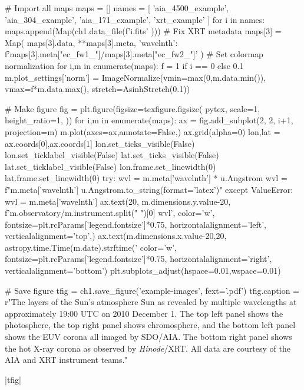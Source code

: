 \begin{pycode}[chapter1]
# Import all maps
maps = []
names = [ 'aia_4500_example', 'aia_304_example', 'aia_171_example', 'xrt_example' ]
for i in names:
    maps.append(Map(ch1.data_file(f'{i}.fits' )))
# Fix XRT metadata
maps[3] = Map(
    maps[3].data,
    {**maps[3].meta, 'wavelnth': f'{maps[3].meta["ec_fw1_"]}/{maps[3].meta["ec_fw2_"]}'}
)
# Set colormap normalization
for i,m in enumerate(maps):
    f = 1 if i == 0 else 0.1
    m.plot_settings['norm'] = ImageNormalize(vmin=max(0,m.data.min()),
                                             vmax=f*m.data.max(),
                                             stretch=AsinhStretch(0.1))

# Make figure
fig = plt.figure(figsize=texfigure.figsize(
    pytex,
    scale=1,
    height_ratio=1,
))
for i,m in enumerate(maps):
    ax = fig.add_subplot(2, 2, i+1, projection=m)
    m.plot(axes=ax,annotate=False,)
    ax.grid(alpha=0)
    lon,lat = ax.coords[0],ax.coords[1]
    lon.set_ticks_visible(False)
    lon.set_ticklabel_visible(False)
    lat.set_ticks_visible(False)
    lat.set_ticklabel_visible(False)
    lon.frame.set_linewidth(0)
    lat.frame.set_linewidth(0)
    try:
        wvl = m.meta['wavelnth'] * u.Angstrom
        wvl = f"{m.meta['wavelnth']} {u.Angstrom.to_string(format='latex')}"
    except ValueError:
        wvl = m.meta['wavelnth']
    ax.text(20, m.dimensions.y.value-20,
            f'{m.observatory}/{m.instrument.split(" ")[0]} {wvl}',
            color='w',
            fontsize=plt.rcParams['legend.fontsize']*0.75,
            horizontalalignment='left',
            verticalalignment='top',)
    ax.text(m.dimensions.x.value-20,20,
            astropy.time.Time(m.date).strftime('%
            color='w',
            fontsize=plt.rcParams['legend.fontsize']*0.75,
            horizontalalignment='right',
            verticalalignment='bottom')
plt.subplots_adjust(hspace=0.01,wspace=0.01)

# Save figure
tfig = ch1.save_figure('example-images', fext='.pdf')
tfig.caption = r"The layers of the Sun's atmosphere Sun as revealed by multiple wavelengths at approximately 19:00 UTC on 2010 December 1. The top left panel shows the photosphere, the top right panel shows chromosphere, and the bottom left panel shows the EUV corona all imaged by SDO/AIA. The bottom right panel shows the hot X-ray corona as observed by \textit{Hinode}/XRT. All data are courtesy of the AIA and XRT instrument teams."
\end{pycode}
\py[chapter1]|tfig|

